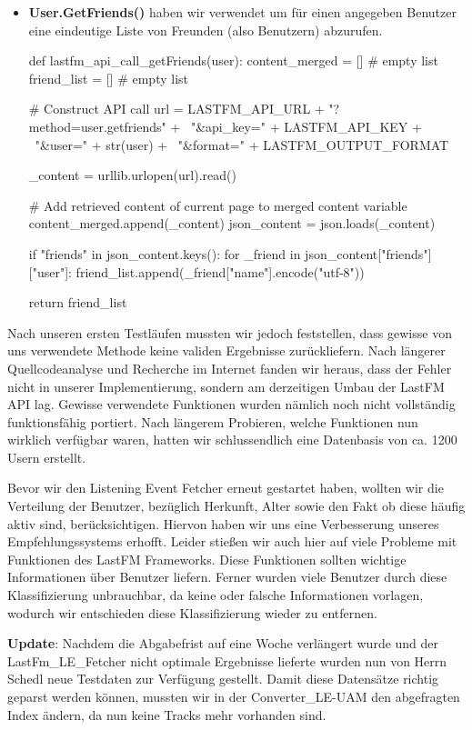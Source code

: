 \documentclass[prodmode,acmtecs]{acmsmall} %
\begin{document}
\begin{itemize}
\item \textbf{User.GetFriends()} haben wir verwendet um für einen angegeben Benutzer eine eindeutige Liste von Freunden (also Benutzern) abzurufen.
\begin{python}
def lastfm_api_call_getFriends(user):
    content_merged = []         # empty list
    friend_list = []            # empty list

    # Construct API call
    url = LASTFM_API_URL + "?method=user.getfriends" + \
        "&api_key=" + LASTFM_API_KEY + \
        "&user=" + str(user) + \
        "&format=" + LASTFM_OUTPUT_FORMAT

    _content = urllib.urlopen(url).read()

    # Add retrieved content of current page to merged content variable
    content_merged.append(_content)
    json_content = json.loads(_content)

    if "friends" in json_content.keys():
        for _friend in json_content["friends"]["user"]:
            friend_list.append(_friend["name"].encode("utf-8"))

    return friend_list
\end{python}
\end{itemize}

Nach unseren ersten Testläufen mussten wir jedoch feststellen, dass gewisse von uns verwendete Methode keine validen Ergebnisse zurückliefern. Nach längerer Quellcodeanalyse und Recherche im Internet fanden wir heraus, dass der Fehler nicht in unserer Implementierung, sondern am derzeitigen Umbau der LastFM API lag. Gewisse verwendete Funktionen wurden nämlich noch nicht vollständig funktionsfähig portiert. Nach längerem Probieren, welche Funktionen nun wirklich verfügbar waren, hatten wir schlussendlich eine Datenbasis von ca. 1200 Usern erstellt.

Bevor wir den Listening Event Fetcher erneut gestartet haben, wollten wir die Verteilung der Benutzer, bezüglich Herkunft, Alter sowie den Fakt ob diese häufig aktiv sind, berücksichtigen. Hiervon haben wir uns eine Verbesserung unseres Empfehlungssystems erhofft. Leider stießen wir auch hier auf viele Probleme mit Funktionen des LastFM Frameworks. Diese Funktionen sollten wichtige Informationen über Benutzer liefern. Ferner wurden viele Benutzer durch diese Klassifizierung unbrauchbar, da keine oder falsche Informationen vorlagen, wodurch wir entschieden diese Klassifizierung wieder zu entfernen.

\textbf{Update}:
Nachdem die Abgabefrist auf eine Woche verlängert wurde und der LastFm\_LE\_Fetcher nicht optimale Ergebnisse lieferte wurden nun von Herrn Schedl neue Testdaten zur Verfügung gestellt. Damit diese Datensätze richtig geparst werden können, mussten wir in der Converter\_LE-UAM den abgefragten Index ändern, da nun keine Tracks mehr vorhanden sind.
\end{document}
